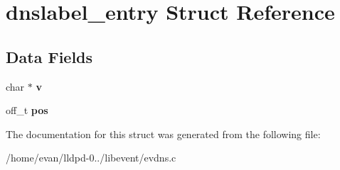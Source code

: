 \section{dnslabel\-\_\-entry \-Struct \-Reference}
\label{structdnslabel__entry}
\subsection*{\-Data \-Fields}
\begin{DoxyCompactItemize}
\item 
char $\ast$ {\bfseries v}\label{structdnslabel__entry_a5f5b1c0720e12aed95287c86052c9c9d}

\item 
off\-\_\-t {\bfseries pos}\label{structdnslabel__entry_a320b91e58d067b5097a431e6da94f247}

\end{DoxyCompactItemize}


\-The documentation for this struct was generated from the following file\-:\begin{DoxyCompactItemize}
\item 
/home/evan/lldpd-\/0../libevent/evdns.\-c\end{DoxyCompactItemize}
